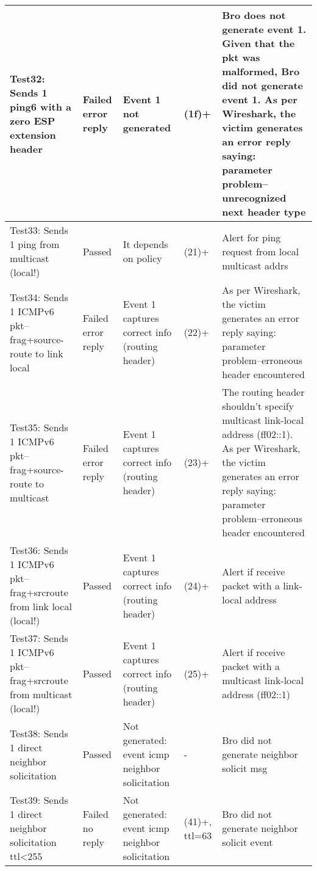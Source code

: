\documentclass{article}
\begin{document}
\begin{longtable}{|p{1.5in}|p{0.5in}|p{1in}|p{0.8in}|p{1.2in}}
Test32: Sends 1 ping6 with a zero ESP extension header &
Failed error reply &
Event 1 not generated &
(1f)+ &
Bro does not generate event 1.
Given that the pkt was malformed, Bro did not generate event 1. 
As per Wireshark, the victim generates an error reply saying: parameter problem--unrecognized next header type   
\\ \hline
Test33: Sends 1 ping from multicast (local!) &
Passed &
It depends on policy &
(21)+ &
Alert for ping request from local multicast addrs  
\\ \hline
Test34: Sends 1 ICMPv6 pkt--frag+source-route to link local &
Failed error reply &
Event 1 captures correct info (routing header) &
(22)+ &
As per Wireshark, the victim generates an error reply saying: parameter problem--erroneous header encountered
\\ \hline
Test35: Sends 1 ICMPv6 pkt--frag+source-route to multicast &
Failed error reply &
Event 1 captures correct info (routing header) &
(23)+ &
The routing header shouldn't specify multicast link-local address (ff02::1).
As per Wireshark, the victim generates an error reply saying: parameter problem--erroneous header encountered
\\ \hline
Test36: Sends 1 ICMPv6 pkt--frag+srcroute from link local (local!) &
Passed &
Event 1 captures correct info (routing header) &
(24)+ &
Alert if receive packet with a link-local address
\\ \hline
Test37: Sends 1 ICMPv6 pkt--frag+srcroute from multicast (local!) &
Passed &
Event 1 captures correct info (routing header) &
(25)+ &
Alert if receive packet with a multicast link-local address (ff02::1)
\\ \hline
Test38: Sends 1 direct neighbor solicitation &
Passed &
Not generated: event icmp neighbor solicitation &
- &
Bro did not generate neighbor solicit msg
\\ \hline
Test39: Sends 1 direct neighbor solicitation ttl<255 &
Failed no reply &
Not generated: event icmp neighbor solicitation &
(41)+, ttl=63 &
Bro did not generate neighbor solicit event
\\ \hline

\end{longtable}
\end{document}
